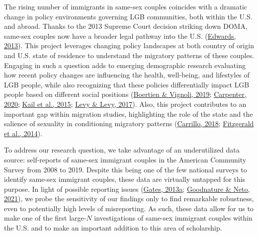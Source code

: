 \documentclass[
  12pt,
]{article}
\begin{document}
The rising number of immigrants in same-sex couples coincides with a dramatic change in policy environments governing LGB communities, both within the U.S. and abroad. Thanks to the 2013 Supreme Court decision striking down DOMA, same-sex couples now have a broader legal pathway into the U.S. (\protect\hyperlink{ref-edwards_2013}{Edwards, 2013}). This project leverages changing policy landscapes at both country of origin and U.S. state of residence to understand the migratory patterns of these couples. Engaging in such a question adds to emerging demographic research evaluating how recent policy changes are influencing the health, well-being, and lifestyles of LGB people, while also recognizing that these policies differentially impact LGB people based on different social positions (\protect\hyperlink{ref-boertien_2019}{Boertien \& Vignoli, 2019}; \protect\hyperlink{ref-carpenter_2020}{Carpenter, 2020}; \protect\hyperlink{ref-kail_2015}{Kail et al., 2015}; \protect\hyperlink{ref-levy_2017}{Levy \& Levy, 2017}). Also, this project contributes to an important gap within migration studies, highlighting the role of the state and the salience of sexuality in conditioning migratory patterns (\protect\hyperlink{ref-carrillo_2018}{Carrillo, 2018}; \protect\hyperlink{ref-fitzgerald_2014}{Fitzgerald et al., 2014}).

To address our research question, we take advantage of an underutilized data source: self-reports of same-sex immigrant couples in the American Community Survey from 2008 to 2019. Despite this being one of the few national surveys to identify same-sex immigrant couples, these data are virtually untapped for this purpose. In light of possible reporting issues (\protect\hyperlink{ref-gates_2013}{Gates, 2013a}; \protect\hyperlink{ref-goodnature_2021}{Goodnature \& Neto, 2021}), we probe the sensitivity of our findings only to find remarkable robustness, even to potentially high levels of misreporting. As such, these data allow for us to make one of the first large-\(N\) investigations of same-sex immigrant couples within the U.S. and to make an important addition to this area of scholarship.
\end{document}
